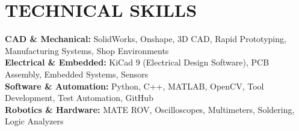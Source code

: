 \documentclass[letterpaper,11pt]{article}
\begin{document}
\section{TECHNICAL SKILLS}
 \begin{itemize}[leftmargin=0.15in, label={}]
    \small{\item{
     \textbf{CAD \& Mechanical:} SolidWorks, Onshape, 3D CAD, Rapid Prototyping, Manufacturing Systems, Shop Environments \\
     \textbf{Electrical \& Embedded:} KiCad 9 (Electrical Design Software), PCB Assembly, Embedded Systems, Sensors \\
     \textbf{Software \& Automation:} Python, C++, MATLAB, OpenCV, Tool Development, Test Automation, GitHub \\
     \textbf{Robotics \& Hardware:} MATE ROV, Oscilloscopes, Multimeters, Soldering, Logic Analyzers
    }}
 \end{itemize}


\end{document}
